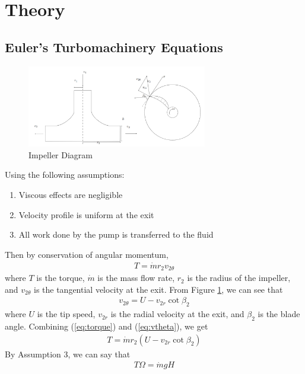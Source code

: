 \section{Theory}
\subsection{Euler's Turbomachinery Equations}
\begin{figure}[h]
    \centering
    \includegraphics[width=0.7\textwidth]{Sections/Figures/theory impeller diagram.png}
    \caption{Impeller Diagram}
    \label{fig:impeller}
\end{figure}
Using the following assumptions:
\begin{enumerate}
    \item Viscous effects are negligible
    \item Velocity profile is uniform at the exit
    \item All work done by the pump is transferred to the fluid
\end{enumerate}
Then by conservation of angular momentum,
\begin{align}
    T = \dot{m} r_2 v_{2\theta} \label{eq:torque}
\end{align}
where $T$ is the torque, $\dot{m}$ is the mass flow rate, $r_2$ is the radius of the impeller, and $v_{2\theta}$ is the tangential velocity at the exit. From Figure \ref{fig:impeller}, we can see that 
\begin{align}
    v_{2\theta} = U - v_{2r} \cot{\beta_2} \label{eq:vtheta}
\end{align}
where $U$ is the tip speed, $v_{2r}$ is the radial velocity at the exit, and $\beta_2$ is the blade angle. Combining (\ref{eq:torque}) and (\ref{eq:vtheta}), we get
\begin{align}
    T = \dot{m} r_2 (U - v_{2r} \cot{\beta_2}) \label{eq:torque2}
\end{align}
By Assumption 3, we can say that
\begin{align}
    T \Omega = \dot{m} g H \label{eq:work}
\end{align}
